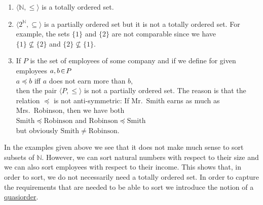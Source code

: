 \examples
\begin{enumerate}
\item $\langle\mathbb{N}, \leq \rangle$ is a totally ordered set.
\item $\langle 2^{\mathbb{N}}, \subseteq \rangle$ is a partially ordered set but it is not a totally
      ordered set.  For example, the sets $\{1\}$ and $\{2\}$ are not comparable since we have
      \\[0.2cm]
      \hspace*{1.3cm}
      $\{1\} \not\subseteq \{2\}$ \quad and \quad  $\{2\} \not\subseteq \{1\}$.
\item If $P$ is the set of employees of some company and if we define for given employees
      $a,b \!\in\! P$
      \\[0.2cm]
      \hspace*{1.3cm}
      $a \preceq b$ \quad iff \quad  $a$ does not earn more than $b$, 
      \\[0.2cm]
      then the pair $\langle P, \leq \rangle$ is not a partially ordered set.  The reason is that
      the relation $\preceq$ is not anti-symmetric:  If Mr.~Smith earns as much as
      Mrs.~Robinson, then we have both
      \\[0.2cm]
      \hspace*{1.3cm}
      $\mathrm{Smith} \preceq \mathrm{Robinson}$ \quad and \quad $\mathrm{Robinson} \preceq \mathrm{Smith}$
      \\[0.2cm]
      but obviously $\mathrm{Smith} \not= \mathrm{Robinson}$.
\end{enumerate}
In the examples given above we see that it does not make much sense to sort subsets of $\mathbb{N}$.
However, we can sort natural numbers with respect to their size and we can also sort employees with
respect to their income.  This shows that, in order to sort,  we do not necessarily need a totally
ordered set.  In order to capture the requirements that are needed to be able to sort we introduce
the notion of a \href{http://en.wikipedia.org/wiki/Preorder}{quasiorder}.
\pagebreak

